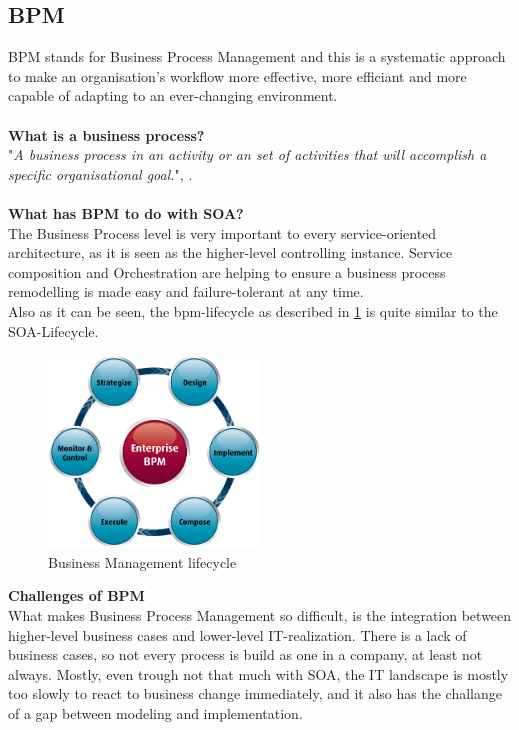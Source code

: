 \documentclass[12pt]{article}
\begin{document}
\subsection{BPM}
BPM stands for Business Process Management and this is a systematic approach to make an organisation's workflow more effective, more efficiant and more capable of adapting to an ever-changing environment. 
\\ \\\textbf{What is a business process?}\\
"\textit{A business process in an activity or an set of activities that will accomplish a specific organisational goal.}", \cite{bpmdef}.
\\ \\\textbf{What has BPM to do with SOA?}\\
The Business Process level is very important to every service-oriented architecture, as it is seen as the higher-level controlling instance. Service composition and Orchestration are helping to ensure a business process remodelling is made easy and failure-tolerant at any time. \cite[page 114]{te} \\
Also as it can be seen, the \gls{bpm}-lifecycle as described in \ref{fig:bpmlc} is quite similar to the SOA-Lifecycle.
\begin{figure}[here!]
	\centering
	\includegraphics[width=0.5\textwidth]{images/bpm.png}
	\caption{Business Management lifecycle \cite{muede2}}
	\label{fig:bpmlc}
	\end{figure}
	\FloatBarrier \noindent
\textbf{Challenges of BPM }\\
What makes Business Process Management so difficult, is the integration between higher-level business cases and lower-level IT-realization. There is a lack of business cases, so not every process is build as one in a company, at least not always. Mostly, even trough not that much with SOA, the IT landscape is mostly too slowly to react to business change immediately, and it also has the challange of a gap between modeling and implementation.\\
\end{document}
